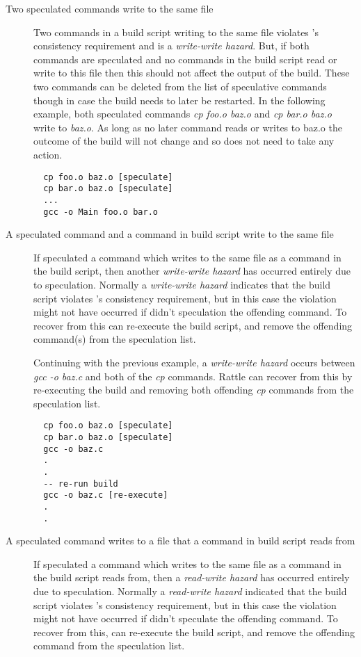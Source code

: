 \begin{description}
\item [Two speculated commands write to the same file]
  Two commands in a build script writing to the same file violates \Rattle's consistency requirement and is a \emph{write-write hazard}.  But, if both commands are speculated and no commands in the build script read or write to this file then this should not affect the output of the build.  These two commands can be deleted from the list of speculative commands though in case the build needs to later be restarted.  In the following example, both speculated commands \emph{cp foo.o baz.o} and \emph{cp bar.o baz.o} write to \emph{baz.o}.  As long as no later command reads or writes to baz.o the outcome of the build will not change and so \Rattle does not need to take any action.
\begin{verbatim}
  cp foo.o baz.o [speculate]
  cp bar.o baz.o [speculate]
  ...
  gcc -o Main foo.o bar.o
\end{verbatim}

\item [A speculated command and a command in build script write to the same file]
  If \Rattle speculated a command which writes to the same file as a command in the build script, then another \emph{write-write hazard} has occurred entirely due to speculation.  Normally a \emph{write-write hazard} indicates that the build script violates \Rattle's consistency requirement, but in this case the violation might not have occurred if \Rattle didn't speculation the offending command.  To recover from this \Rattle can re-execute the build script, and remove the offending command(s) from the speculation list.

  Continuing with the previous example, a \emph{write-write hazard} occurs between \emph{gcc -o baz.c} and both of the \emph{cp} commands.  Rattle can recover from this by re-executing the build and removing both offending \emph{cp} commands from the speculation list.

\begin{verbatim}
  cp foo.o baz.o [speculate]
  cp bar.o baz.o [speculate]
  gcc -o baz.c
  .
  .
  -- re-run build
  gcc -o baz.c [re-execute]
  .
  .
\end{verbatim}

\item [A speculated command writes to a file that a command in build script reads from]
  If \Rattle speculated a command which writes to the same file as a command in the build script reads from, then a \emph{read-write hazard} has occurred entirely due to speculation.  Normally a \emph{read-write hazard} indicated that the build script violates \Rattle's consistency requirement, but in this case the violation might not have occurred if \Rattle didn't speculate the offending command.  To recover from this, \Rattle can re-execute the build script, and remove the offending command from the speculation list.


\end{description}
